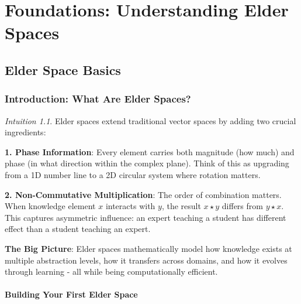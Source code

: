 \documentclass[12pt,a4paper]{book}
\theoremstyle{definition}
\theoremstyle{remark}
\newtheorem*{intuition}{Intuition}
\begin{document}
\tableofcontents
\listoffigures
\listoftables

\mainmatter

\part{Foundations: Understanding Elder Spaces}

\chapter{Elder Space Basics}

\section{Introduction: What Are Elder Spaces?}

\begin{intuition}
Elder spaces extend traditional vector spaces by adding two crucial ingredients:

\textbf{1. Phase Information}: Every element carries both magnitude (how much) and phase (in what direction within the complex plane). Think of this as upgrading from a 1D number line to a 2D circular system where rotation matters.

\textbf{2. Non-Commutative Multiplication}: The order of combination matters. When knowledge element $x$ interacts with $y$, the result $x \star y$ differs from $y \star x$. This captures asymmetric influence: an expert teaching a student has different effect than a student teaching an expert.

\textbf{The Big Picture}: Elder spaces mathematically model how knowledge exists at multiple abstraction levels, how it transfers across domains, and how it evolves through learning - all while being computationally efficient.
\end{intuition}

\subsection{Building Your First Elder Space}
\end{document}
